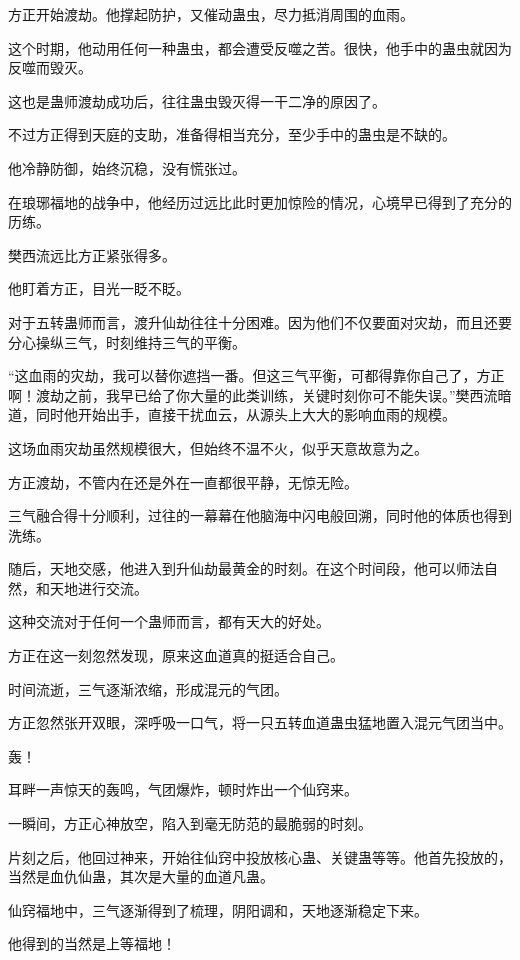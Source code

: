 \begin{this_body}
方正开始渡劫。他撑起防护，又催动蛊虫，尽力抵消周围的血雨。

这个时期，他动用任何一种蛊虫，都会遭受反噬之苦。很快，他手中的蛊虫就因为反噬而毁灭。

这也是蛊师渡劫成功后，往往蛊虫毁灭得一干二净的原因了。

不过方正得到天庭的支助，准备得相当充分，至少手中的蛊虫是不缺的。

他冷静防御，始终沉稳，没有慌张过。

在琅琊福地的战争中，他经历过远比此时更加惊险的情况，心境早已得到了充分的历练。

樊西流远比方正紧张得多。

他盯着方正，目光一眨不眨。

对于五转蛊师而言，渡升仙劫往往十分困难。因为他们不仅要面对灾劫，而且还要分心操纵三气，时刻维持三气的平衡。

“这血雨的灾劫，我可以替你遮挡一番。但这三气平衡，可都得靠你自己了，方正啊！渡劫之前，我早已给了你大量的此类训练，关键时刻你可不能失误。”樊西流暗道，同时他开始出手，直接干扰血云，从源头上大大的影响血雨的规模。

这场血雨灾劫虽然规模很大，但始终不温不火，似乎天意故意为之。

方正渡劫，不管内在还是外在一直都很平静，无惊无险。

三气融合得十分顺利，过往的一幕幕在他脑海中闪电般回溯，同时他的体质也得到洗练。

随后，天地交感，他进入到升仙劫最黄金的时刻。在这个时间段，他可以师法自然，和天地进行交流。

这种交流对于任何一个蛊师而言，都有天大的好处。

方正在这一刻忽然发现，原来这血道真的挺适合自己。

时间流逝，三气逐渐浓缩，形成混元的气团。

方正忽然张开双眼，深呼吸一口气，将一只五转血道蛊虫猛地置入混元气团当中。

轰！

耳畔一声惊天的轰鸣，气团爆炸，顿时炸出一个仙窍来。

一瞬间，方正心神放空，陷入到毫无防范的最脆弱的时刻。

片刻之后，他回过神来，开始往仙窍中投放核心蛊、关键蛊等等。他首先投放的，当然是血仇仙蛊，其次是大量的血道凡蛊。

仙窍福地中，三气逐渐得到了梳理，阴阳调和，天地逐渐稳定下来。

他得到的当然是上等福地！


\end{this_body}
